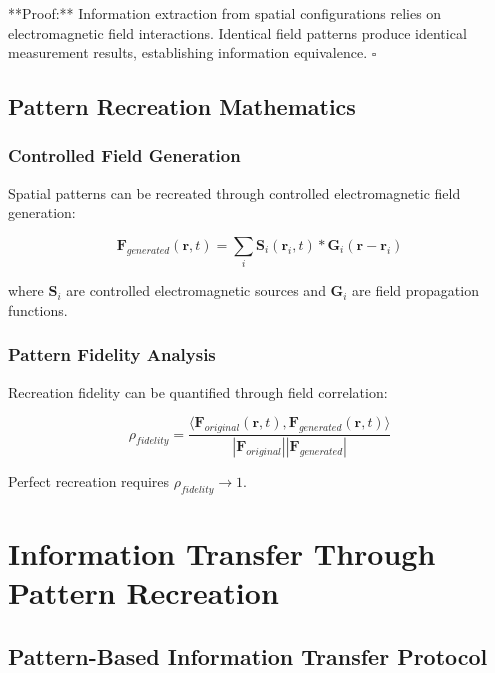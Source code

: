 \documentclass[12pt,a4paper]{article}
\begin{document}
**Proof:** Information extraction from spatial configurations relies on electromagnetic field interactions. Identical field patterns produce identical measurement results, establishing information equivalence. $\square$

\subsection{Pattern Recreation Mathematics}

\subsubsection{Controlled Field Generation}

Spatial patterns can be recreated through controlled electromagnetic field generation:

\begin{equation}
\mathbf{F}_{generated}(\mathbf{r}, t) = \sum_i \mathbf{S}_i(\mathbf{r}_i, t) \ast \mathbf{G}_i(\mathbf{r} - \mathbf{r}_i)
\label{eq:controlled_field_generation}
\end{equation}

where $\mathbf{S}_i$ are controlled electromagnetic sources and $\mathbf{G}_i$ are field propagation functions.

\subsubsection{Pattern Fidelity Analysis}

Recreation fidelity can be quantified through field correlation:

\begin{equation}
\rho_{fidelity} = \frac{\langle \mathbf{F}_{original}(\mathbf{r}, t), \mathbf{F}_{generated}(\mathbf{r}, t) \rangle}{|\mathbf{F}_{original}||\mathbf{F}_{generated}|}
\label{eq:pattern_fidelity}
\end{equation}

Perfect recreation requires $\rho_{fidelity} \rightarrow 1$.

\section{Information Transfer Through Pattern Recreation}

\subsection{Pattern-Based Information Transfer Protocol}
\end{document}

